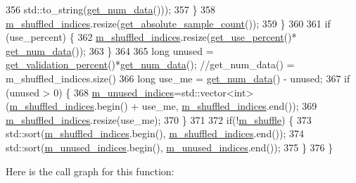 \begin{DoxyCode}
356         std::to\_string(\hyperlink{classlbann_1_1generic__data__reader_adcdb833aff7ce85b0879334b252f357a}{get\_num\_data}()));
357     \}
358     \hyperlink{classlbann_1_1generic__data__reader_aaab6aeff67ffff1c689336851fec2c57}{m\_shuffled\_indices}.resize(\hyperlink{classlbann_1_1generic__data__reader_a1e8655cd1883d850566694bcf2ad60ab}{get\_absolute\_sample\_count}());
359   \}
360 
361   \textcolor{keywordflow}{if} (use\_percent) \{
362     \hyperlink{classlbann_1_1generic__data__reader_aaab6aeff67ffff1c689336851fec2c57}{m\_shuffled\_indices}.resize(\hyperlink{classlbann_1_1generic__data__reader_a5853fa5e619b886699954aca6440dd8a}{get\_use\_percent}()*
      \hyperlink{classlbann_1_1generic__data__reader_adcdb833aff7ce85b0879334b252f357a}{get\_num\_data}());
363   \}
364 
365   \textcolor{keywordtype}{long} unused = \hyperlink{classlbann_1_1generic__data__reader_ab06058b5fa1d74239998358b02f73132}{get\_validation\_percent}()*\hyperlink{classlbann_1_1generic__data__reader_adcdb833aff7ce85b0879334b252f357a}{get\_num\_data}(); \textcolor{comment}{//get\_num\_data()
       = m\_shuffled\_indices.size()}
366   \textcolor{keywordtype}{long} use\_me = \hyperlink{classlbann_1_1generic__data__reader_adcdb833aff7ce85b0879334b252f357a}{get\_num\_data}() - unused;
367   \textcolor{keywordflow}{if} (unused > 0) \{
368       \hyperlink{classlbann_1_1generic__data__reader_a0bc0ee42e95d23687ddcc30d6c338b19}{m\_unused\_indices}=std::vector<int>(\hyperlink{classlbann_1_1generic__data__reader_aaab6aeff67ffff1c689336851fec2c57}{m\_shuffled\_indices}.begin() + 
      use\_me, \hyperlink{classlbann_1_1generic__data__reader_aaab6aeff67ffff1c689336851fec2c57}{m\_shuffled\_indices}.end());
369       \hyperlink{classlbann_1_1generic__data__reader_aaab6aeff67ffff1c689336851fec2c57}{m\_shuffled\_indices}.resize(use\_me);
370     \}
371 
372   \textcolor{keywordflow}{if}(!\hyperlink{classlbann_1_1generic__data__reader_a8039ed9c12a5847f0dcf7dd54b8d2f5b}{m\_shuffle}) \{
373     std::sort(\hyperlink{classlbann_1_1generic__data__reader_aaab6aeff67ffff1c689336851fec2c57}{m\_shuffled\_indices}.begin(), \hyperlink{classlbann_1_1generic__data__reader_aaab6aeff67ffff1c689336851fec2c57}{m\_shuffled\_indices}.end());
374     std::sort(\hyperlink{classlbann_1_1generic__data__reader_a0bc0ee42e95d23687ddcc30d6c338b19}{m\_unused\_indices}.begin(), \hyperlink{classlbann_1_1generic__data__reader_a0bc0ee42e95d23687ddcc30d6c338b19}{m\_unused\_indices}.end());
375   \}
376 \}
\end{DoxyCode}
Here is the call graph for this function\+:\nopagebreak
